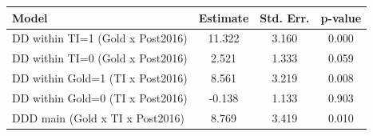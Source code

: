 \begin{tabular}{lccc}
\toprule
Model & Estimate & Std. Err. & p-value \\
\midrule
DD within TI=1 (Gold x Post2016) & 11.322 & 3.160 & 0.000 \\
DD within TI=0 (Gold x Post2016) & 2.521 & 1.333 & 0.059 \\
DD within Gold=1 (TI x Post2016) & 8.561 & 3.219 & 0.008 \\
DD within Gold=0 (TI x Post2016) & -0.138 & 1.133 & 0.903 \\
DDD main (Gold x TI x Post2016) & 8.769 & 3.419 & 0.010 \\
\bottomrule
\end{tabular}
